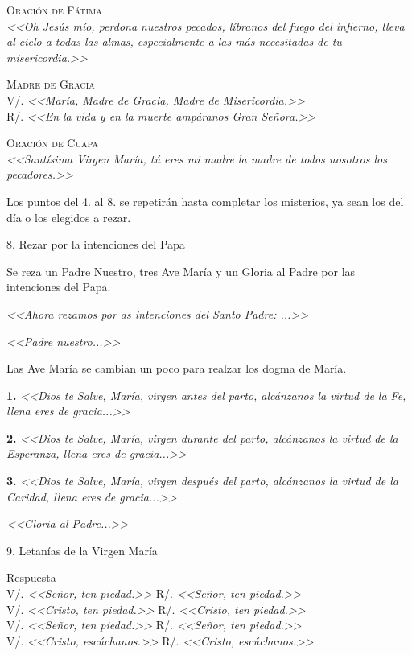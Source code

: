 \documentclass[12pt, letterpaper]{report}
\begin{document}
    \textsc{Oración de Fátima}\\
    \textit{<<Oh Jesús mío, perdona nuestros pecados, líbranos del fuego del infierno, lleva al cielo a todas las almas, especialmente a las más necesitadas de tu misericordia.>>}
    
    \textsc{Madre de Gracia}\\
    V/. \textit{<<María, Madre de Gracia, Madre de Misericordia.>>}\\R/. \textit{<<En la vida y en la muerte ampáranos Gran Señora.>>}
    
    \textsc{Oración de Cuapa}\\
    \textit{<<Santísima Virgen María, tú eres mi madre la madre de todos nosotros los pecadores.>>}
    
    \Large Los puntos del 4. al 8. se repetirán hasta completar los misterios, ya sean los del día o los elegidos a rezar.
    
    \LARGE 8. Rezar por la intenciones del Papa
    
    \Large Se reza un Padre Nuestro, tres Ave María y un Gloria al Padre por las intenciones del Papa.
    
    \textit{<<Ahora rezamos por as intenciones del Santo Padre: ...>>}
    
    \textit{<<Padre nuestro...>>}

    Las Ave María se cambian un poco para realzar los dogma de María.
    
    \textbf{1.} \textit{<<Dios te Salve, María, virgen antes del parto, alcánzanos la virtud de la Fe, llena eres de gracia...>>}
    
    \textbf{2.} \textit{<<Dios te Salve, María, virgen durante del parto, alcánzanos la virtud de la Esperanza, llena eres de gracia...>>}
    
    \textbf{3.} \textit{<<Dios te Salve, María, virgen después del parto, alcánzanos la virtud de la Caridad, llena eres de gracia...>>}
    
    \textit{<<Gloria al Padre...>>}
        
    \LARGE 9. Letanías de la Virgen María
    
    \Large \hfill{Respuesta}\\
    \Large V/. \textit{<<Señor, ten piedad.>>} \hfill{R/. \textit{<<Señor, ten piedad.>>}}\\
    \Large V/. \textit{<<Cristo, ten piedad.>>} \hfill{R/. \textit{<<Cristo, ten piedad.>>}}\\
    \Large V/. \textit{<<Señor, ten piedad.>>} \hfill{R/. \textit{<<Señor, ten piedad.>>}}\\
    \Large V/. \textit{<<Cristo, escúchanos.>>} \hfill{R/. \textit{<<Cristo, escúchanos.>>}}
    
\end{document}
